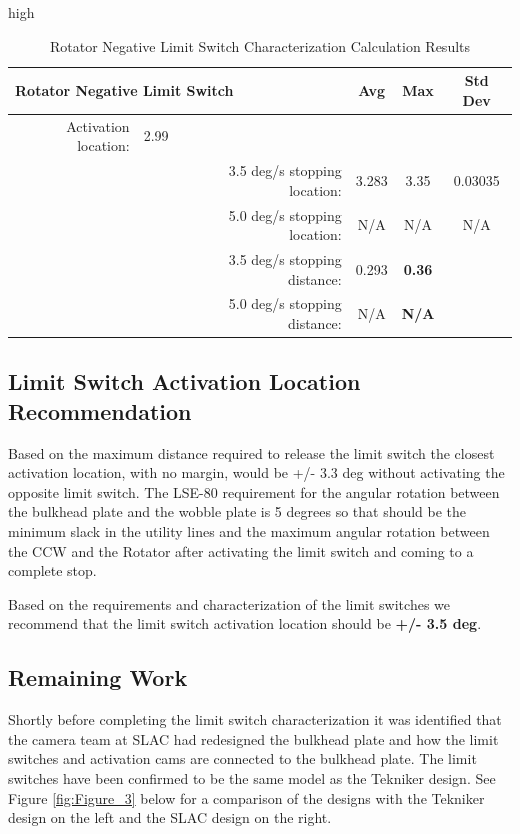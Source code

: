 high\documentclass[SE,lsstdraft,authoryear,toc]{lsstdoc}
\begin{document}
\begin{landscape}
\begin{table}[h!]
  \begin{center}
    \caption{Rotator Negative Limit Switch Characterization Calculation Results}
    \label{tab:table4}
    \begin{tabular}{r|c|r|c|c|c}
    \multicolumn{3}{l|}{\textbf{Rotator Negative Limit Switch}} & Avg & Max & Std Dev\\
    \midrule
    Activation location: & 2.99 & & & & \\
    & & 3.5 deg/s stopping location: & 3.283 & 3.35 & 0.03035 \\
    & & 5.0 deg/s stopping location: & N/A & N/A & N/A \\
    & & 3.5 deg/s stopping distance: & 0.293 & \textbf{0.36} & \\
    & & 5.0 deg/s stopping distance: & N/A & \textbf{N/A} & \\
    \end{tabular}
  \end{center}
\end{table}

\end{landscape}

\subsection{Limit Switch Activation Location Recommendation}

Based on the maximum distance required to release the limit switch the
closest activation location, with no margin, would be +/- 3.3 deg
without activating the opposite limit switch. The LSE-80 requirement for
the angular rotation between the bulkhead plate and the wobble plate is
5 degrees so that should be the minimum slack in the utility lines and
the maximum angular rotation between the CCW and the Rotator after
activating the limit switch and coming to a complete stop.

Based on the requirements and characterization of the limit switches we
recommend that the limit switch activation location should be
\textbf{+/- 3.5 deg}.

\subsection{Remaining Work}

Shortly before completing the limit switch characterization it was
identified that the camera team at SLAC had redesigned the bulkhead
plate and how the limit switches and activation cams are connected to
the bulkhead plate. The limit switches have been confirmed to be the
same model as the Tekniker design. See Figure \ref{fig:Figure_3} below for a comparison
of the designs with the Tekniker design on the left and the SLAC design
on the right.
\end{document}
